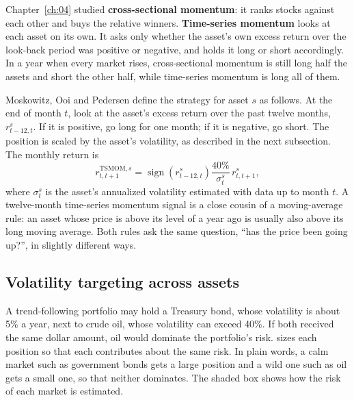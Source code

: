 Chapter~\ref{ch:04} studied \textbf{cross-sectional momentum}: it ranks stocks against each other and buys the relative winners. \textbf{Time-series momentum} looks at each asset on its own. It asks only whether the asset's own excess return over the look-back period was positive or negative, and holds it long or short accordingly. In a year when every market rises, cross-sectional momentum is still long half the assets and short the other half, while time-series momentum is long all of them.

Moskowitz, Ooi and Pedersen define the strategy for asset $s$ as follows. At the end of month $t$, look at the asset's excess return over the past twelve months, $r^s_{t-12,t}$. If it is positive, go long for one month; if it is negative, go short. The position is scaled by the asset's volatility, as described in the next subsection. The monthly return is
\begin{equation}
  r^{\text{TSMOM},s}_{t,t+1} = \operatorname{sign}\left(r^s_{t-12,t}\right) \frac{40\%}{\sigma^s_t}\, r^s_{t,t+1},
  \label{eq:08-tsmom}
\end{equation}
where $\sigma^s_t$ is the asset's annualized volatility estimated with data up to month $t$. A twelve-month time-series momentum signal is a close cousin of a moving-average rule: an asset whose price is above its level of a year ago is usually also above its long moving average. Both rules ask the same question, ``has the price been going up?'', in slightly different ways.

\subsection{Volatility targeting across assets}

A trend-following portfolio may hold a Treasury bond, whose volatility is about 5\% a year, next to crude oil, whose volatility can exceed 40\%. If both received the same dollar amount, oil would dominate the portfolio's risk.  sizes each position so that each contributes about the same risk. In plain words, a calm market such as government bonds gets a large position and a wild one such as oil gets a small one, so that neither dominates. The shaded box shows how the risk of each market is estimated.

